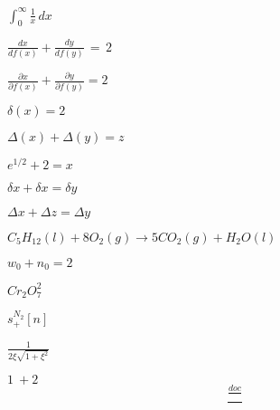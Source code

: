 \documentclass{article}
\begin{document}
$\int_0^{\infty} \frac{1}{x}\, dx$


$\frac{dx}{df(x)} + \frac{dy}{df(y)}\, =\, 2$


$\frac{\partial x}{\partial f(x)} + \frac{\partial y}{\partial f(y)} = 2$


$\delta (x) = 2$

$\Delta (x) + \Delta (y) = z$

$e^{1/2} + 2 = x$

$\delta x + \delta x = \delta y$

$\Delta x + \Delta z = \Delta y$

$C_5H_{12}(l)+8O_2(g)\rightarrow 5CO_2(g)+H_2O(l)$

$w_0 + n_0 = 2$

$Cr_2O_7^2$

$s^{N_2}_+ [n]$

$\frac{1}{2\xi \sqrt{1+\xi^2}}$

$1\: + 2$
\[
  \frac{ \frac{doc}{}}{}
\]
\end{document}

